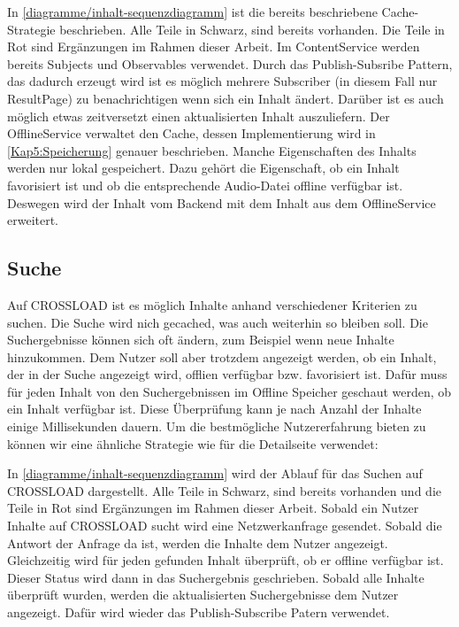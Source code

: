 
In \autoref{diagramme/inhalt-sequenzdiagramm} ist die bereits beschriebene Cache-Strategie beschrieben. Alle Teile in Schwarz, sind bereits vorhanden. Die Teile in Rot sind Ergänzungen im Rahmen dieser Arbeit. Im ContentService werden bereits Subjects und Observables verwendet. Durch das Publish-Subsribe Pattern, das dadurch erzeugt wird ist es möglich mehrere Subscriber (in diesem Fall nur ResultPage) zu benachrichtigen wenn sich ein Inhalt ändert. Darüber ist es auch möglich etwas zeitversetzt einen aktualisierten Inhalt auszuliefern. Der OfflineService verwaltet den Cache, dessen Implementierung wird in \autoref{Kap5:Speicherung} genauer beschrieben. Manche Eigenschaften des Inhalts werden nur lokal gespeichert. Dazu gehört die Eigenschaft, ob ein Inhalt favorisiert ist und ob die entsprechende Audio-Datei offline verfügbar ist. Deswegen wird der Inhalt vom Backend mit dem Inhalt aus dem OfflineService erweitert.

\subsection{Suche}
Auf CROSSLOAD ist es möglich Inhalte anhand verschiedener Kriterien zu suchen. Die Suche wird nich gecached, was auch weiterhin so bleiben soll. Die Suchergebnisse können sich oft ändern, zum Beispiel wenn neue Inhalte hinzukommen. Dem Nutzer soll aber trotzdem angezeigt werden, ob ein Inhalt, der in der Suche angezeigt wird, offlien verfügbar bzw. favorisiert ist. Dafür muss für jeden Inhalt von den Suchergebnissen im Offline Speicher geschaut werden, ob ein Inhalt verfügbar ist. Diese Überprüfung kann je nach Anzahl der Inhalte einige Millisekunden dauern. Um die bestmögliche Nutzererfahrung bieten zu können wir eine ähnliche Strategie wie für die Detailseite verwendet:


In \autoref{diagramme/inhalt-sequenzdiagramm} wird der Ablauf für das Suchen auf CROSSLOAD dargestellt. Alle Teile in Schwarz, sind bereits vorhanden und die Teile in Rot sind Ergänzungen im Rahmen dieser Arbeit. Sobald ein Nutzer Inhalte auf CROSSLOAD sucht wird eine Netzwerkanfrage gesendet. Sobald die Antwort der Anfrage da ist, werden die Inhalte dem Nutzer angezeigt. Gleichzeitig wird für jeden gefunden Inhalt überprüft, ob er offline verfügbar ist. Dieser Status wird dann in das Suchergebnis geschrieben. Sobald alle Inhalte überprüft wurden, werden die aktualisierten Suchergebnisse dem Nutzer angezeigt. Dafür wird wieder das Publish-Subscribe Patern verwendet. 

